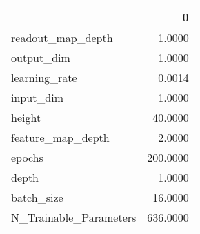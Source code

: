 \begin{tabular}{lr}
\toprule
{} &         0 \\
\midrule
readout\_map\_depth      &    1.0000 \\
output\_dim             &    1.0000 \\
learning\_rate          &    0.0014 \\
input\_dim              &    1.0000 \\
height                 &   40.0000 \\
feature\_map\_depth      &    2.0000 \\
epochs                 &  200.0000 \\
depth                  &    1.0000 \\
batch\_size             &   16.0000 \\
N\_Trainable\_Parameters &  636.0000 \\
\bottomrule
\end{tabular}
